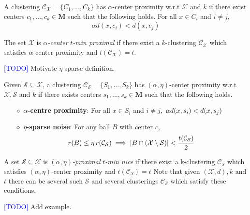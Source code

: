 \documentclass[anon,12pt]{colt2016} %
\newcommand{\mc}{\mathcal}
\newcommand{\mb}{\mathbf}
\newcommand{\todo}{\textcolor{blue}{[TODO]}\xspace}
\begin{document}
\begin{definition}
\label{defn:alphacp}
A clustering $\mc C_{\mc X} = \{C_1, \ldots, C_k\}$ has $\alpha$-center proximity w.r.t $\mc X$ and $k$ if there exist centers $c_1, \ldots, c_k \in \mb M$  such that the following holds. For all $x \in C_i$ and $i\neq j$, 
$$\alpha d(x, c_i) < d(x, c_j)$$
\end{definition}

\noindent The set $\mc X$ is {\it $\alpha$-center} {\it $t$-min proximal} if there exist a $k$-clustering $\mc C_{\mc X}$  which satisfies $\alpha$-center proximity and $t(\mc C_{\mc X}) = t$. 

\todo Motivate $\eta$-sparse definition.

\begin{definition}[$(\alpha, \eta)$-center proximity]
Given $\mc S \subseteq \mc X$, a clustering $\mc C_{\mc S} = \{S_1, \ldots, S_k\}$ has $(\alpha, \eta)$-center proximity w.r.t $\mc X, \mc S$ and $k$ if there exists centers $s_1, \ldots, s_k \in \mb M$  such that the following holds.

\begin{itemize}[nolistsep, noitemsep]
\label{defn:alphacpnoise}	

\item[$\diamond$] {\bf $\alpha$-centre proximity}: For all $x \in S_i$ and $i\neq j$, $\thinspace\alpha d(x, s_i) < d(x, s_j)$
\item[$\diamond$]{\bf $\eta$-sparse noise}: For any ball $B$ with center $c$, 
\vspace{-0.1in}\begin{align*}
r(B)\leq \eta \thinspace r(\mc{C}_{\mc S}) \implies |B\cap (\mc X\setminus \mc S)| < \frac{t(\mc C_{\mc S})}{2}
\end{align*}
\end{itemize}
\end{definition}

\noindent A set $\mc S \subseteq \mc X$ is {\it $(\alpha, \eta)$-proximal} {\it $t$-min nice} if there exist a k-clustering $\mc C_{\mc S}$ which satisfies $(\alpha, \eta)$-center proximity and $t(\mc{C}_{\mc{S}}) = t$ %
Note that given $(\mc X, d), k$ and $t$ there can be several such $\mc S$ and several clusterings $\mc C_{\mc S}$ which satisfy these conditions.

\todo Add example.
\end{document}

